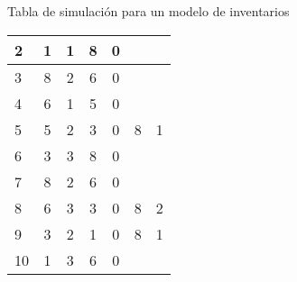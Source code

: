 \begin{frame}{Tabla de simulación para un modelo de inventarios}{}
{\begin{table}[]
\begin{tabular}{|l|c|c|c|c|c|c|}
\rowcolor[HTML]{F28165} 
{\color[HTML]{FFFFFF} 2} & {\color[HTML]{FFFFFF} 1} & {\color[HTML]{FFFFFF} 1} & {\color[HTML]{FFFFFF} 8} & {\color[HTML]{FFFFFF} 0} & {\color[HTML]{FFFFFF} } & {\color[HTML]{FFFFFF} } \\ \hline
\rowcolor[HTML]{F28165} 
{\color[HTML]{FFFFFF} 3} & {\color[HTML]{FFFFFF} 8} & {\color[HTML]{FFFFFF} 2} & {\color[HTML]{FFFFFF} 6} & {\color[HTML]{FFFFFF} 0} & {\color[HTML]{FFFFFF} } & {\color[HTML]{FFFFFF} } \\ \hline
\rowcolor[HTML]{F28165} 
{\color[HTML]{FFFFFF} 4} & {\color[HTML]{FFFFFF} 6} & {\color[HTML]{FFFFFF} 1} & {\color[HTML]{FFFFFF} 5} & {\color[HTML]{FFFFFF} 0} & {\color[HTML]{FFFFFF} } & {\color[HTML]{FFFFFF} } \\ \hline
\rowcolor[HTML]{F28165} 
{\color[HTML]{FFFFFF} 5} & {\color[HTML]{FFFFFF} 5} & {\color[HTML]{FFFFFF} 2} & {\color[HTML]{FFFFFF} 3} & {\color[HTML]{FFFFFF} 0} & {\color[HTML]{FFFFFF} 8} & {\color[HTML]{FFFFFF} 1} \\ \hline
\rowcolor[HTML]{F28165} 
{\color[HTML]{FFFFFF} 6} & {\color[HTML]{FFFFFF} 3} & {\color[HTML]{FFFFFF} 3} & {\color[HTML]{FFFFFF} 8} & {\color[HTML]{FFFFFF} 0} & {\color[HTML]{FFFFFF} } & {\color[HTML]{FFFFFF} } \\ \hline
\rowcolor[HTML]{F28165} 
{\color[HTML]{FFFFFF} 7} & {\color[HTML]{FFFFFF} 8} & {\color[HTML]{FFFFFF} 2} & {\color[HTML]{FFFFFF} 6} & {\color[HTML]{FFFFFF} 0} & {\color[HTML]{FFFFFF} } & {\color[HTML]{FFFFFF} } \\ \hline
\rowcolor[HTML]{F28165} 
{\color[HTML]{FFFFFF} 8} & {\color[HTML]{FFFFFF} 6} & {\color[HTML]{FFFFFF} 3} & {\color[HTML]{FFFFFF} 3} & {\color[HTML]{FFFFFF} 0} & {\color[HTML]{FFFFFF} 8} & {\color[HTML]{FFFFFF} 2} \\ \hline
\rowcolor[HTML]{F28165} 
{\color[HTML]{FFFFFF} 9} & {\color[HTML]{FFFFFF} 3} & {\color[HTML]{FFFFFF} 2} & {\color[HTML]{FFFFFF} 1} & {\color[HTML]{FFFFFF} 0} & {\color[HTML]{FFFFFF} 8} & {\color[HTML]{FFFFFF} 1} \\ \hline
\rowcolor[HTML]{F28165} 
{\color[HTML]{FFFFFF} 10} & {\color[HTML]{FFFFFF} 1} & {\color[HTML]{FFFFFF} 3} & {\color[HTML]{FFFFFF} 6} & {\color[HTML]{FFFFFF} 0} & {\color[HTML]{FFFFFF} } & {\color[HTML]{FFFFFF} } \\ \hline
\end{tabular}
\end{table}}
\end{frame}


